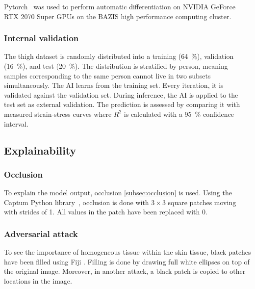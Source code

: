 Pytorch~ was used to perform automatic differentiation on NVIDIA GeForce RTX 2070 Super GPUs on the BAZIS high performance computing cluster.

\subsubsection{Internal validation}\label{subsec:skin_dataset}
The thigh dataset is randomly distributed into a training (\qty{64}{\percent}), validation (\qty{16}{\percent}), and test (\qty{20}{\percent}).
The distribution is stratified by person, meaning samples corresponding to the same person cannot live in two subsets simultaneously.
The AI learns from the training set.
Every iteration, it is validated against the validation set.
During inference, the AI is applied to the test set as external validation.
The prediction is assessed by comparing it with measured strain-stress curves where $R^2$ is calculated with a \qty{95}{\percent} confidence interval.


\subsection{Explainability}

\subsubsection{Occlusion}
To explain the model output, occlusion \cref{subsec:occlusion} is used.
Using the Captum Python library~, occlusion is done with $3\times3$ square patches moving with strides of 1.
All values in the patch have been replaced with 0.

\subsubsection{Adversarial attack}
To see the importance of homogeneous tissue within the skin tissue, black patches have been filled using Fiji .
Filling is done by drawing full white ellipses on top of the original image.
Moreover, in another attack, a black patch is copied to other locations in the image.
